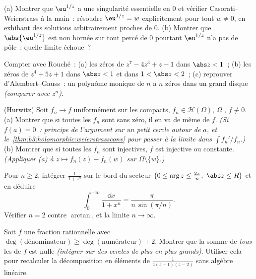 \begin{exercise}[$\star\star$]\label{exo:b3:residues:6}
(a) Montrer que $\eu^{1/z}$ a une singularité essentielle en
$0$ et vérifier Casorati--Weierstrass à la main~: résoudre
$\eu^{1/z} = w$ explicitement pour tout $w \neq 0$, en
exhibant des solutions arbitrairement proches de $0$.
(b) Montrer que $\abs{\eu^{1/z}}$ est non bornée sur tout
 percé de $0$ pourtant $\eu^{1/z}$ n'a pas de
pôle~: quelle limite échoue~?
\end{exercise}

\begin{exercise}[$\star\star$]\label{exo:b3:residues:7}
Compter avec Rouché~:
(a) les zéros de $z^7 - 4z^3 + z - 1$ dans $\abs z < 1$~;
(b) les zéros de $z^4 + 5z + 1$ dans $\abs z < 1$ et dans $1
< \abs z < 2$~;
(c) reprouver d'Alembert--Gauss~: un polynôme monique de
 $n$ a $n$ zéros dans un grand disque \emph{(comparer
avec $z^n$)}.
\end{exercise}

\begin{exercise}[$\star\star\star$]\label{exo:b3:residues:8}
(Hurwitz) Soit $f_n \to f$ uniformément sur les compacts,
$f_n \in \mathcal H(\Omega)$, $\Omega$ , $f
\not\equiv 0$.
(a) Montrer que si toutes les $f_n$ sont sans zéro, il en va
de même de $f$. \emph{(Si $f(a) = 0$~: principe de l'argument
sur un petit cercle autour de $a$, et
le~\cref{thm:b3:holomorphic:weierstrassconv} pour passer à
la limite dans $\int f_n'/f_n$.)}
(b) Montrer que si toutes les $f_n$ sont injectives, $f$ est
injective ou constante. \emph{(Appliquer (a) à $z \mapsto
f_n(z) - f_n(w)$ sur $\Omega\setminus\{w\}$.)}
\end{exercise}

\begin{exercise}[$\star\star\star$]\label{exo:b3:residues:9}
Pour $n \geq 2$, intégrer $\frac1{1 + z^n}$ sur le bord du
secteur $\{0 \leq \arg z \leq \frac{2\pi}n,\ \abs z \leq R\}$
et en déduire
\[
\int_0^{+\infty}\frac{\dd x}{1 + x^n} =
\frac{\pi}{n\,\sin(\pi/n)} .
\]
Vérifier $n = 2$ contre $\arctan$, et la limite $n \to
\infty$.
\end{exercise}

\begin{exercise}[$\star\star$]\label{exo:b3:residues:10}
Soit $f$ une fraction rationnelle avec
$\deg(\text{dénominateur}) \geq \deg(\text{numérateur}) +
2$. Montrer que la somme de \emph{tous} les  de $f$
est nulle \emph{(intégrer sur des cercles de plus en plus
grands)}. Utiliser cela pour recalculer la décomposition en
éléments  de $\frac1{z(z-1)(z-2)}$ sans algèbre
linéaire.
\end{exercise}

